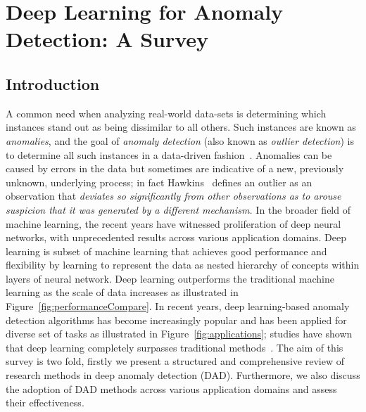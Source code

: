 \chapter{Deep Learning for Anomaly Detection: A Survey}
\label{chpt:survey}
\section{Introduction}

A common need when analyzing real-world data-sets is determining which instances stand out as being dissimilar to all others. Such instances are known as \emph{anomalies}, and the goal of \emph{anomaly detection} (also known as \emph{outlier detection}) is to determine all such instances in a data-driven fashion~\cite{chandola2007outlier}. Anomalies can be caused by errors in the data but sometimes are indicative of a new, previously unknown, underlying process; in fact Hawkins~\cite{hawkins} defines an outlier as an observation that {\it deviates so significantly from other observations as to arouse suspicion that it was generated by a different mechanism.} In the broader field of machine learning, the recent years have witnessed proliferation of deep neural networks, with unprecedented results across various application domains. Deep learning is subset of machine learning that achieves good performance and flexibility by learning to represent the data as nested hierarchy of concepts within layers of neural network. Deep learning outperforms the traditional machine learning as the scale of data increases as illustrated in Figure~\ref{fig:performanceCompare}. In recent years, deep learning-based anomaly detection algorithms has become increasingly popular and has been applied for diverse set of tasks as illustrated in Figure~\ref{fig:applications}; studies have shown that deep learning completely surpasses traditional methods~\cite{javaid2016deep,peng2015multi}. The aim of this survey is two fold, firstly we present a structured and comprehensive review of research methods in deep anomaly detection (DAD). Furthermore, we also discuss the adoption of  DAD methods across various application domains and assess their effectiveness.


